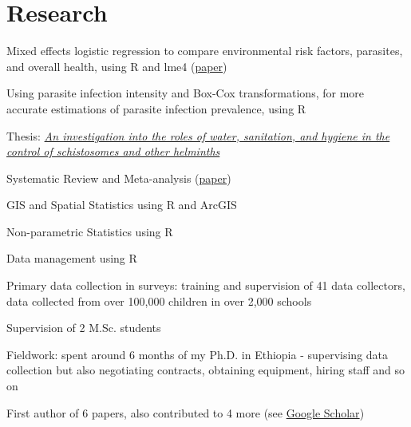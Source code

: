 \documentclass[]{cv-template}
\begin{document}
\begin{minipage}[t]{0.66\textwidth}
\section{Research}
\begin{tightemize}
\item Mixed effects logistic regression to compare environmental risk factors, parasites, and overall health, using R and lme4 (\href{https://journals.plos.org/plosntds/article?id=10.1371/journal.pntd.0005948}{paper})
\item Using parasite infection intensity and Box-Cox transformations, for more accurate estimations of parasite infection prevalence, using R
\end{tightemize}
\sectionsep


Thesis: {\href{https://spiral.imperial.ac.uk/handle/10044/1/44497}{\textit{An investigation into the roles of water, sanitation, and hygiene in the control of schistosomes and other helminths}}}
\begin{tightemize}
\item Systematic Review and Meta-analysis (\href{https://journals.plos.org/plosntds/article?id=10.1371/journal.pntd.0003296}{paper})
\item GIS and Spatial Statistics using R and ArcGIS
\item Non-parametric Statistics using R
\item Data management using R
\item Primary data collection in surveys: training and supervision of 41 data collectors, data collected from over 100,000 children in over 2,000 schools
\item Supervision of 2 M.Sc. students
\item Fieldwork: spent around 6 months of my Ph.D. in Ethiopia - supervising data collection but also negotiating contracts, obtaining equipment, hiring staff and so on
\item First author of 6 papers, also contributed to 4 more (see \href{https://scholar.google.co.uk/citations?hl=en&user=HZLogpQAAAAJ}{Google Scholar})
\end{tightemize}
\sectionsep


\end{minipage}
\end{document}
